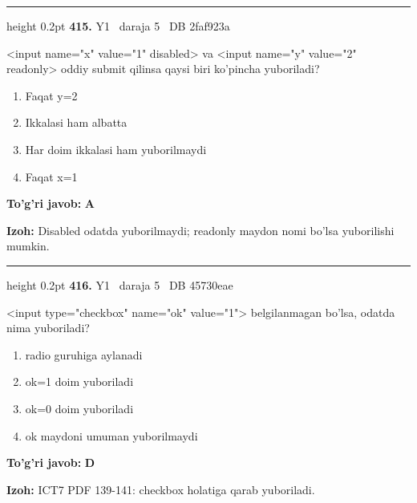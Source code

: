 \documentclass[10pt,a4paper,oneside]{article}
\begin{document}
\vspace{2mm}\hrule height 0.2pt \vspace{4mm}
\hypertarget{q415}{\textbf{\color{ink}415.}}  {\color{muted}\scriptsize Y1 \textbullet\ daraja 5 \textbullet\ DB 2faf923a}
\par
\textless{}input name="x" value="1" disabled\textgreater{} va \textless{}input name="y" value="2" readonly\textgreater{} oddiy submit qilinsa qaysi biri ko'pincha yuboriladi?
\begin{enumerate}[label=\Alph*),leftmargin=9mm]
\item Faqat y=2
\item Ikkalasi ham albatta
\item Har doim ikkalasi ham yuborilmaydi
\item Faqat x=1
\end{enumerate}
\begin{tcolorbox}[enhanced,breakable,colback=teal!4,colframe=teal!45!black,boxrule=0.45pt,arc=1.2mm,left=2.8mm,right=2.8mm,top=2mm,bottom=2mm,before skip=2mm,after skip=2mm]
\textbf{\color{teal}To'g'ri javob:} \textbf{A}
\par\smallskip
\textbf{Izoh:} Disabled odatda yuborilmaydi; readonly maydon nomi bo'lsa yuborilishi mumkin.
\end{tcolorbox}
\vspace{2mm}\hrule height 0.2pt \vspace{4mm}
\hypertarget{q416}{\textbf{\color{ink}416.}}  {\color{muted}\scriptsize Y1 \textbullet\ daraja 5 \textbullet\ DB 45730eae}
\par
\textless{}input type="checkbox" name="ok" value="1"\textgreater{} belgilanmagan bo'lsa, odatda nima yuboriladi?
\begin{enumerate}[label=\Alph*),leftmargin=9mm]
\item radio guruhiga aylanadi
\item ok=1 doim yuboriladi
\item ok=0 doim yuboriladi
\item ok maydoni umuman yuborilmaydi
\end{enumerate}
\begin{tcolorbox}[enhanced,breakable,colback=teal!4,colframe=teal!45!black,boxrule=0.45pt,arc=1.2mm,left=2.8mm,right=2.8mm,top=2mm,bottom=2mm,before skip=2mm,after skip=2mm]
\textbf{\color{teal}To'g'ri javob:} \textbf{D}
\par\smallskip
\textbf{Izoh:} ICT7 PDF 139-141: checkbox holatiga qarab yuboriladi.
\end{tcolorbox}
\end{document}
